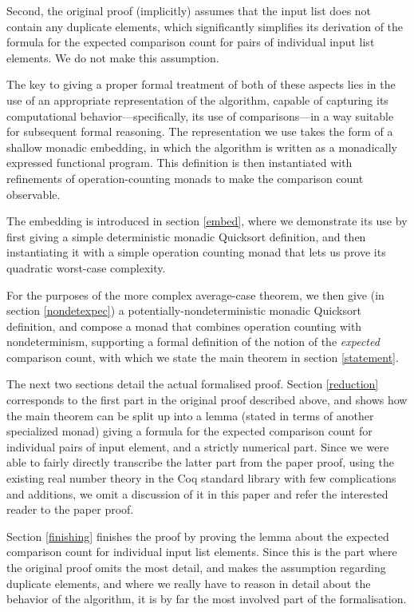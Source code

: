 \documentclass[runningheads]{llncs}
\begin{document}
Second, the original proof (implicitly) assumes that the input list does not contain any duplicate elements, which significantly simplifies its derivation of the formula for the expected comparison count for pairs of individual input list elements. We do not make this assumption.

The key to giving a proper formal treatment of both of these aspects lies in the use of an appropriate representation of the algorithm, capable of capturing its computational behavior---specifically, its use of comparisons---in a way suitable for subsequent formal reasoning. The representation we use takes the form of a shallow monadic embedding, in which the algorithm is written as a monadically expressed functional program. This definition is then instantiated with refinements of operation-counting monads to make the comparison count observable.

The embedding is introduced in section \ref{embed}, where we demonstrate its use by first giving a simple deterministic monadic Quicksort definition, and then instantiating it with a simple operation counting monad that lets us prove its quadratic worst-case complexity.

For the purposes of the more complex average-case theorem, we then give (in section \ref{nondetexpec}) a potentially-nondeterministic monadic Quicksort definition, and compose a monad that combines operation counting with nondeterminism, supporting a formal definition of the notion of the \emph{expected} comparison count, with which we state the main theorem in section \ref{statement}.

The next two sections detail the actual formalised proof. Section \ref{reduction} corresponds to the first part in the original proof described above, and shows how the main theorem can be split up into a lemma (stated in terms of another specialized monad) giving a formula for the expected comparison count for individual pairs of input element, and a strictly numerical part. Since we were able to fairly directly transcribe the latter part from the paper proof, using the existing real number theory in the Coq standard library with few complications and additions, we omit a discussion of it in this paper and refer the interested reader to the paper proof.

Section \ref{finishing} finishes the proof by proving the lemma about the expected comparison count for individual input list elements. Since this is the part where the original proof omits the most detail, and makes the assumption regarding duplicate elements, and where we really have to reason in detail about the behavior of the algorithm, it is by far the most involved part of the formalisation.
\end{document}
